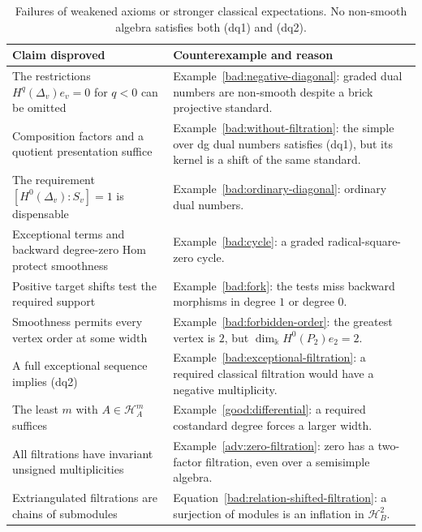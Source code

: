 \documentclass[11pt,a4paper]{article}
\renewcommand{\H}{\mathcal H}
\newcommand{\std}{\Delta}
\theoremstyle{plain}
\theoremstyle{definition}
\numberwithin{equation}{section}
\begin{document}
\begin{table}[htbp]
\centering\small
\begin{tabularx}{\linewidth}{@{}>{\raggedright\arraybackslash}p{.42\linewidth}>{\raggedright\arraybackslash}X@{}}
\toprule
Claim disproved & Counterexample and reason\\\midrule
The restrictions $H^q(\std_v)e_v=0$ for $q<0$ can be omitted &
Example~\ref{bad:negative-diagonal}: graded dual numbers are
non-smooth despite a brick projective standard.\\
Composition factors and a quotient presentation suffice &
Example~\ref{bad:without-filtration}: the simple over dg dual
numbers satisfies (dq1), but its kernel is a shift of the same
standard.\\
The requirement $[H^0(\std_v):S_v]=1$ is dispensable &
Example~\ref{bad:ordinary-diagonal}: ordinary dual numbers.\\
Exceptional terms and backward degree-zero Hom protect smoothness &
Example~\ref{bad:cycle}: a graded radical-square-zero cycle.\\
Positive target shifts test the required support &
Example~\ref{bad:fork}: the tests miss backward morphisms in
degree $1$ or degree $0$.\\
Smoothness permits every vertex order at some width &
Example~\ref{bad:forbidden-order}: the greatest vertex is $2$, but
$\dim_{\Bbbk}H^0(P_2)e_2=2$.\\
A full exceptional sequence implies (dq2) &
Example~\ref{bad:exceptional-filtration}: a required classical
filtration would have a negative multiplicity.\\
The least $m$ with $A\in\H_A^m$ suffices &
Example~\ref{good:differential}: a required costandard degree
forces a larger width.\\
All filtrations have invariant unsigned multiplicities &
Example~\ref{adv:zero-filtration}: zero has a two-factor filtration,
even over a semisimple algebra.\\
Extriangulated filtrations are chains of submodules &
Equation~\eqref{bad:relation-shifted-filtration}: a surjection of
modules is an inflation in $\H_B^2$.\\
\bottomrule
\end{tabularx}
\caption{Failures of weakened axioms or stronger classical expectations.
No non-smooth algebra satisfies both (dq1) and (dq2).}
\label{tab:counterexamples}
\end{table}

\clearpage
\end{document}
